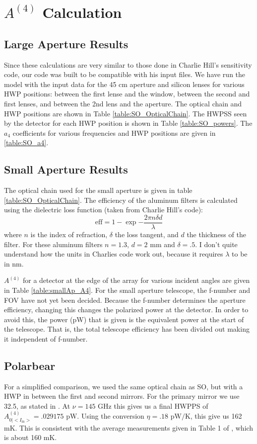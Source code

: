 \documentclass{article}
\theoremstyle{remark}
\newcommand{\tab}{\hspace*{2em}}
\renewcommand{\t}[1]{\text{#1}}
\newcommand{\AI}{A^{(4)}_{0|<I_{\t{in}}>}}
\newcommand{\A}[1]{A^{(#1)}}
\begin{document}
\section{$\A4$ Calculation}

\subsection{Large Aperture Results}

\tab Since these calculations are very similar to those done in Charlie Hill's sensitivity code,
our code was built to be compatible with his input files.
We have run the model with the input data for the 45 cm aperture and silicon lenses for various HWP positions:
between the first lense and the window, between the second and first lenses, and between the 2nd lens and the aperture.
The optical chain and HWP positions are shown in Table \ref{table:SO_OpticalChain}.
The HWPSS seen by the detector for each HWP position is shown in Table \ref{table:SO_powers}.
The $a_4$ coefficients for various frequencies and HWP positions are given in \ref{table:SO_a4}.


\subsection{Small Aperture Results}

The optical chain used for the small aperture is given in table \ref{table:SO_OpticalChain}. 
The efficiency of the aluminum filters is calculated using the dielectric loss function (taken from Charlie Hill's code):
\[\t{eff} = 1 - \exp{- \frac{2 \pi n \delta d}{\lambda}}\]
where $n$ is the index of refraction, $\delta$ the loss tangent, and $d$ the thickness of the filter.
For these aluminum filters $n = 1.3$, $d = 2\text{ mm}$ and $\delta = .5$. 
I don't quite understand how the units in Charlies code work out, because it requires $\lambda$ to be in nm.

$\A4$ for a detector at the edge of the array for various incident angles are given in Table \ref{table:smallAp_A4}.
For the small aperture telescope, the f-number and FOV have not yet been decided. 
Because the f-number determines the aperture efficiency, changing this changes the polarized power at the detector.
In order to avoid this, the power (pW) that is given is the equivalent power at the start of the telescope.
That is, the total telescope efficiency has been divided out making it independent of f-number.


\subsection{Polarbear}
\tab For a simplified comparison, we used the same optical chain as SO, but with a HWP in between the first and second mirrors.
For the primary mirror we use 32.5\degree, as stated in \cite{takakura_performance_2017}. At $\nu = 145 \t{ GHz}$ this gives us a final 
HWPPS of $\AI = .029175 \t{ pW}$. Using the conversion $\eta = .18 \t{ pW/K}$, this give us 162 mK.
This is consistent with the average measurements given in Table 1 of \cite{takakura_performance_2017}, which is about 160 mK.
\end{document}
